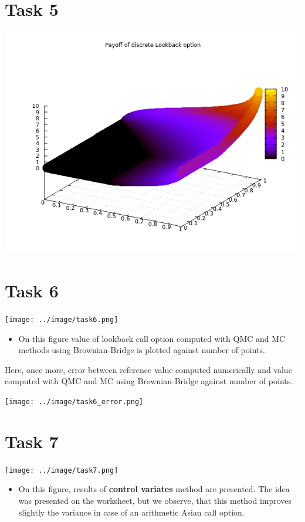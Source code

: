 \documentclass[10pt,a4paper]{article}
\begin{document}
\section*{Task 5}

\begin{center}
	\includegraphics[scale=0.7]{payoff_lookback.png}
\end{center}

\section*{Task 6}

\begin{center}
	\texttt{[image: ../image/task6.png]}
\end{center}
\begin{itemize}
    \item{
        On this figure value of lookback call option computed with QMC and MC methods using Brownian-Bridge is plotted against number of points.
        
    }
     
\end{itemize}
Here, once more, error between reference value computed numerically and value computed with QMC and MC using Brownian-Bridge against number of points.
\begin{center}
	\texttt{[image: ../image/task6\_error.png]}
\end{center}

\section*{Task 7}


\begin{center}
	\texttt{[image: ../image/task7.png]}
\end{center}
\begin{itemize}
    \item{
        On this figure, results of \textbf{control variates}
        method are presented. The idea was presented on the worksheet, but we observe, that this method improves slightly the variance in case of an arithmetic Asian call option. 
    }
\end{itemize}
\end{document}

